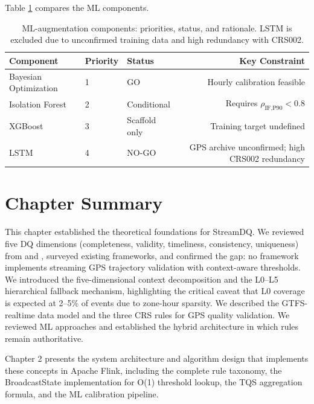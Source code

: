 Table \ref{tab:ml-comparison} compares the ML components.

\begin{table}[htbp]
  \centering
  \caption{ML-augmentation components: priorities, status, and rationale.
    LSTM is excluded due to unconfirmed training data and high redundancy
    with CRS002.}
  \label{tab:ml-comparison}
  \begin{tabular}{lllr}
    \toprule
    Component           & Priority & Status         & Key Constraint \\
    \midrule
    Bayesian Optimization & 1     & GO             & Hourly calibration feasible \\
    Isolation Forest    & 2       & Conditional     & Requires $\rho_{\text{IF,P90}} < 0.8$ \\
    XGBoost             & 3       & Scaffold only   & Training target undefined \\
    LSTM                & 4       & NO-GO          & GPS archive unconfirmed; high CRS002 redundancy \\
    \bottomrule
  \end{tabular}
\end{table}

\section{Chapter Summary}
\label{sec:ch1-summary}

This chapter established the theoretical foundations for StreamDQ. We reviewed
five DQ dimensions (completeness, validity, timeliness, consistency, uniqueness)
from \citep{redman1998} and \citep{otto2011}, surveyed existing frameworks,
and confirmed the gap: no framework implements streaming GPS trajectory
validation with context-aware thresholds. We introduced the five-dimensional
context decomposition and the L0--L5 hierarchical fallback mechanism,
highlighting the critical caveat that L0 coverage is expected at 2--5\%
of events due to zone-hour sparsity. We described the GTFS-realtime data
model and the three CRS rules for GPS quality validation. We reviewed ML
approaches and established the hybrid architecture in which rules remain
authoritative.

Chapter 2 presents the system architecture and algorithm design that
implements these concepts in Apache Flink, including the complete rule
taxonomy, the BroadcastState implementation for O(1) threshold lookup,
the TQS aggregation formula, and the ML calibration pipeline.
